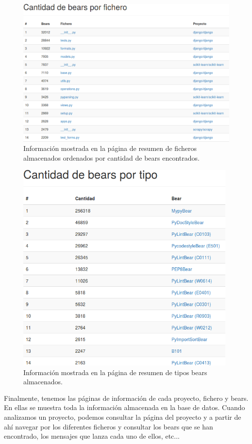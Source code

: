 \documentclass[a4paper, 12pt]{book}
\begin{document}
\begin{figure}[H]
  \centering
  \includegraphics[width=13cm, keepaspectratio]{img/resumenFicheros}
  \caption{Información mostrada en la página de resumen de ficheros almacenados ordenados por cantidad de bears encontrados.}
  \label{fig:resumenFicheros}
\end{figure}

\begin{figure}[H]
  \centering
  \includegraphics[width=11cm, keepaspectratio]{img/resumenBears}
  \caption{Información mostrada en la página de resumen de tipos bears almacenados.}
  \label{fig:resumenBears}
\end{figure}

Finalmente, tenemos las páginas de información de cada proyecto, fichero y bears. En ellas se muestra toda la información almacenada en la base de datos. Cuando analizamos un proyecto, podemos consultar la página del proyecto y a partir de ahí navegar por los diferentes ficheros y consultar los bears que se han encontrado, los mensajes que lanza cada uno de ellos, etc...
\end{document}
